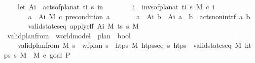 \begin{isabellebody}
\ \ \ \ {\isacharparenleft}{\kern0pt}let\ A\isactrlsub i\ {\isacharequal}{\kern0pt}\ acts{\isacharunderscore}{\kern0pt}of{\isacharunderscore}{\kern0pt}plan{\isacharunderscore}{\kern0pt}at\ t\isactrlsub i\ {\isasympi}s\ in\isanewline
\ \ \ \ \ \ \ \ {\isacharparenleft}{\kern0pt}{\isasymforall}i\ {\isasymin}\ invs{\isacharunderscore}{\kern0pt}of{\isacharunderscore}{\kern0pt}plan{\isacharunderscore}{\kern0pt}at\ t\isactrlsub i\ {\isasympi}s{\isachardot}{\kern0pt}\ M\ \isactrlsup c{\isasymTTurnstile}\isactrlsub {\isacharequal}{\kern0pt}\ i{\isacharparenright}{\kern0pt}\isanewline
\ \ \ \ \ \ {\isasymand}\ {\isacharparenleft}{\kern0pt}{\isasymforall}a\ {\isasymin}\ A\isactrlsub i{\isachardot}{\kern0pt}\ M\ \isactrlsup c{\isasymTTurnstile}\isactrlsub {\isacharequal}{\kern0pt}\ precondition\ a{\isacharparenright}{\kern0pt}\isanewline
\ \ \ \ \ \ {\isasymand}\ {\isacharparenleft}{\kern0pt}{\isasymforall}a\ {\isasymin}\ A\isactrlsub i{\isachardot}{\kern0pt}\ {\isasymforall}b\ {\isasymin}\ A\isactrlsub i{\isachardot}{\kern0pt}\ a\ {\isasymnoteq}\ b\ {\isasymlongrightarrow}\ acts{\isacharunderscore}{\kern0pt}non{\isacharunderscore}{\kern0pt}intrf\ a\ b{\isacharparenright}{\kern0pt}\isanewline
\ \ \ \ \ \ {\isasymand}\ valid{\isacharunderscore}{\kern0pt}state{\isacharunderscore}{\kern0pt}seq\ {\isacharparenleft}{\kern0pt}apply{\isacharunderscore}{\kern0pt}eff\ A\isactrlsub i\ M{\isacharparenright}{\kern0pt}\ ts\ {\isasympi}s\ M{\isacharprime}{\kern0pt}{\isacharparenright}{\kern0pt}{\isachardoublequoteclose}\isanewline
\isanewline
\ \ \isamarkupfalse%
\ valid{\isacharunderscore}{\kern0pt}plan{\isacharunderscore}{\kern0pt}from\ {\isacharcolon}{\kern0pt}{\isacharcolon}{\kern0pt}\ {\isachardoublequoteopen}world{\isacharunderscore}{\kern0pt}model\ {\isasymRightarrow}\ plan\ {\isasymRightarrow}\ bool{\isachardoublequoteclose}\ \isanewline
\ \ \ \ {\isachardoublequoteopen}valid{\isacharunderscore}{\kern0pt}plan{\isacharunderscore}{\kern0pt}from\ M\ {\isasympi}s\ {\isasymlongleftrightarrow}\ {\isacharparenleft}{\kern0pt}wf{\isacharunderscore}{\kern0pt}plan\ {\isasympi}s\ {\isasymand}\ {\isacharparenleft}{\kern0pt}{\isasymexists}htps\ M{\isacharprime}{\kern0pt}{\isachardot}{\kern0pt}\ htps{\isacharunderscore}{\kern0pt}seq\ {\isasympi}s\ htps\ {\isasymand}\ valid{\isacharunderscore}{\kern0pt}state{\isacharunderscore}{\kern0pt}seq\ M\ htps\ {\isasympi}s\ M{\isacharprime}{\kern0pt}\ {\isasymand}\ M{\isacharprime}{\kern0pt}\ \isactrlsup c{\isasymTTurnstile}\isactrlsub {\isacharequal}{\kern0pt}\ {\isacharparenleft}{\kern0pt}goal\ P{\isacharparenright}{\kern0pt}{\isacharparenright}{\kern0pt}{\isacharparenright}{\kern0pt}{\isachardoublequoteclose}\isanewline

\end{isabellebody}
